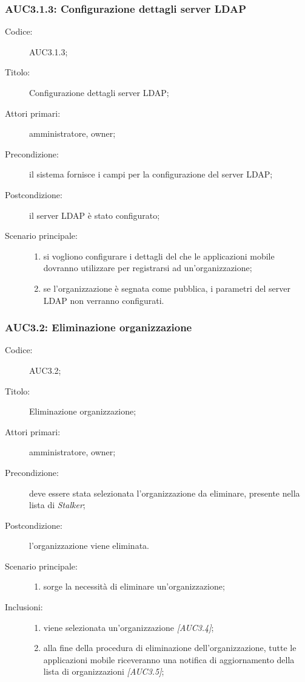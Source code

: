 \documentclass[../../../analisi-dei-requisiti.tex]{subfiles}
\begin{document}
\subsubsection{AUC3.1.3: Configurazione dettagli server LDAP}%
\label{subs:AUC3.1.3}
\begin{description}
  \item[Codice:] AUC3.1.3;
  \item[Titolo:] Configurazione dettagli server LDAP;
  \item[Attori primari:] amministratore, owner;
  \item[Precondizione:] il sistema fornisce i campi per la configurazione del server LDAP;
  \item[Postcondizione:] il server LDAP è stato configurato;
  \item[Scenario principale:]
        \begin{enumerate}
          \item si vogliono configurare i dettagli del  che le applicazioni mobile dovranno utilizzare per registrarsi ad un'organizzazione;
          \item se l'organizzazione è segnata come pubblica, i parametri del server LDAP non verranno configurati.
        \end{enumerate}
\end{description}

\subsubsection{AUC3.2: Eliminazione organizzazione}%
\label{subs:AUC3.2}
\begin{description}
  \item[Codice:] AUC3.2;
  \item[Titolo:] Eliminazione organizzazione;
  \item[Attori primari:] amministratore, owner;
  \item[Precondizione:] deve essere stata selezionata l'organizzazione da eliminare, presente nella lista di \emph{Stalker};
  \item[Postcondizione:] l'organizzazione viene eliminata.
  \item[Scenario principale:]
        \begin{enumerate}
          \item sorge la necessità di eliminare un'organizzazione;
        \end{enumerate}
  \item[Inclusioni:]
        \begin{enumerate}
          \item viene selezionata un'organizzazione \emph{[AUC3.4]};
          \item alla fine della procedura di eliminazione dell'organizzazione, tutte le applicazioni mobile riceveranno una notifica di aggiornamento della lista di organizzazioni \emph{[AUC3.5]};
        \end{enumerate}
\end{description}
\end{document}
